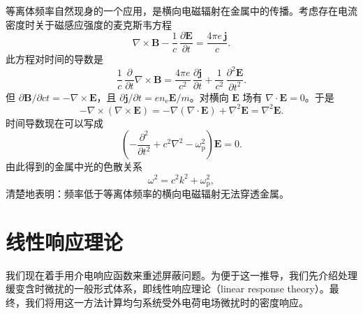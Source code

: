 等离体频率自然现身的一个应用，是横向电磁辐射在金属中的传播。考虑存在电流密度时关于磁感应强度的麦克斯韦方程
\begin{equation*}
\nabla\times\mathbf{B}-\frac{1}{c}\,\frac{\partial\mathbf{E}}{\partial t}=\frac{4\pi e\,\mathbf{j}}{c}.\tag{9.38}
\end{equation*}
此方程对时间的导数是
\begin{equation*}
\frac{1}{c}\,\frac{\partial}{\partial t}\nabla\times\mathbf{B}=\frac{4\pi e}{c^2}\,\frac{\partial\mathbf{j}}{\partial t}+\frac{1}{c^2}\,\frac{\partial^2\mathbf{E}}{\partial t^2}.\tag{9.39}
\end{equation*}
但 $\partial\mathbf{B}/\partial ct=-\nabla\times\mathbf{E}$，且 $\partial\mathbf{j}/\partial t=en_{\mathrm{e}}\mathbf{E}/m$。对横向 $\mathbf{E}$ 场有 $\nabla\cdot\mathbf{E}=0$。于是
\begin{equation*}
-\nabla\times(\nabla\times\mathbf{E})=-\nabla(\nabla\cdot\mathbf{E})+\nabla^2\mathbf{E}=\nabla^2\mathbf{E}.\tag{9.40}
\end{equation*}
时间导数现在可以写成
\begin{equation*}
\left(-\frac{\partial^2}{\partial t^2}+c^2\nabla^2-\omega_{\mathrm{p}}^2\right)\mathbf{E}=0.\tag{9.41}
\end{equation*}
由此得到的金属中光的色散关系
\begin{equation*}
\omega^2=c^2k^2+\omega_{\mathrm{p}}^2,\tag{9.42}
\end{equation*}
清楚地表明：频率低于等离体频率的横向电磁辐射无法穿透金属。

\section{线性响应理论}

我们现在着手用介电响应函数来重述屏蔽问题。为便于这一推导，我们先介绍处理缓变含时微扰的一般形式体系，即线性响应理论（linear response theory）。最终，我们将用这一方法计算均匀系统受外电荷电场微扰时的密度响应。

